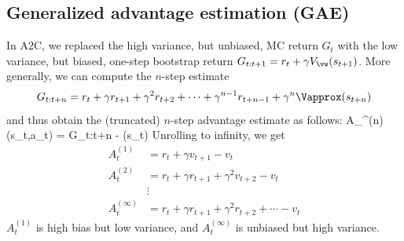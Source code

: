 



\subsection{Generalized advantage estimation (GAE)}
\label{sec:GAE}


In A2C, we replaced the high variance, but unbiased,
MC return $G_t$
with the low variance, but biased,
one-step bootstrap return $G_{t:t+1} = r_t + \gamma V_{\vw}(s_{t+1})$.
More generally, we can compute the
$n$-step estimate
\begin{align}
G_{t:t+n} =
r_t + \gamma r_{t+1} + \gamma^2 r_{t+2}
+ \cdots + \gamma^{n-1} r_{t+n-1} + \gamma^n \Vapprox(s_{t+n})
\end{align}
and thus obtain  the (truncated) $n$-step advantage estimate as follows:
\be
A_{\vw}^{(n)}(s_t,a_t) = G_{t:t+n} - \Vapprox(s_t)
\ee
Unrolling to infinity, we get
\begin{align}
  A_t^{(1)} &= r_t + \gamma v_{t+1} - v_t  \\
  A_t^{(2)} &= r_t + \gamma r_{t+1} + \gamma^2 v_{t+2} - v_t  \\
  &\vdots \\
  A_t^{(\infty)} &= r_t + \gamma r_{t+1} + \gamma^2 r_{t+2} +\cdots - v_t 
  \end{align}
$A_t^{(1)}$ is high bias but low variance,
and $A_t^{(\infty)}$  is unbiased but high variance.


